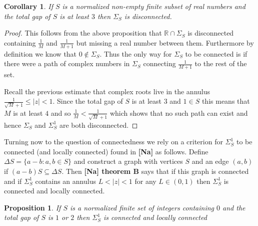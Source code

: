 \documentclass[11pt]{amsart}
\newtheorem{corollary}[theorem]{Corollary}
\newtheorem{proposition}[theorem]{Proposition}
\numberwithin{theorem}{section} %
\numberwithin{corollary}{section}
\numberwithin{lemma}{section}
\numberwithin{proposition}{section}
\numberwithin{definition}{section}
\begin{document}
\begin{corollary}
If $S$ is a normalized non-empty finite subset of real numbers and the total gap of $S$ is at least $3$ then $\Sigma_S$ is disconnected.
\end{corollary}

\begin{proof}
This follows from the above proposition that $\mathbb{R} \cap \Sigma_S$ is disconnected containing $\frac{1}{M}$ and $\frac{1}{M+1}$ but missing a real number between them. Furthermore by definition we know that $0 \notin \Sigma_S$. Thus the only way for $\Sigma_S$ to be connected is if there were a path of complex numbers in $\Sigma_S$ connecting $\frac{1}{M+1}$ to the rest of the set. 

Recall the previous estimate that complex roots live in the annulus $\frac{1}{\sqrt{M}+1} \leqslant |z| < 1$. Since the total gap of $S$ is at least $3$ and $1 \in S$ this means that $M$ is at least $4$ and so $\frac{1}{M} < \frac{1}{\sqrt{M}+1}$ which shows that no such path can exist and hence $\Sigma_S$ and $\Sigma_S^1$ are both disconnected.
\end{proof}































Turning now to the question of connectedness we rely on a criterion for $\Sigma_S^1$ to be connected (and locally connected) found in \textbf{[Na]} as follows. Define $\Delta S = \{ a - b : a, b \in S \}$ and construct a graph with vertices $S$ and an edge $(a, b)$ if $(a-b)S \subseteq \Delta S$. Then \textbf{[Na] theorem B} says that if this graph is connected and if $\Sigma_S^1$ contains an annulus $L < |z| < 1$ for any $L \in (0, 1)$ then $\Sigma_S^1$ is connected and locally connected.


\begin{proposition}
If $S$ is a normalized finite set of integers containing $0$ and the total gap of $S$ is $1$ or $2$ then $\Sigma_S^1$ is connected and locally connected
\end{proposition}
\end{document}
